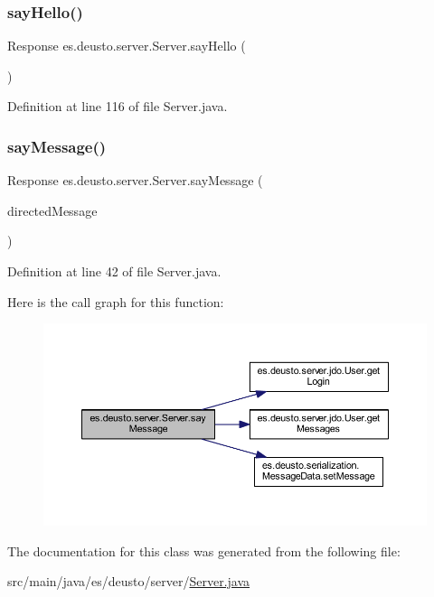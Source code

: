 \subsubsection{\texorpdfstring{sayHello()}{sayHello()}}
{\footnotesize\ttfamily Response es.\+deusto.\+server.\+Server.\+say\+Hello (\begin{DoxyParamCaption}{ }\end{DoxyParamCaption})}



Definition at line 116 of file Server.\+java.

\mbox{\label{classes_1_1deusto_1_1server_1_1_server_ae90127b1bf186f1d871a5a0f98c37da0}} 
\subsubsection{\texorpdfstring{sayMessage()}{sayMessage()}}
{\footnotesize\ttfamily Response es.\+deusto.\+server.\+Server.\+say\+Message (\begin{DoxyParamCaption}\item[{\mbox{\hyperlink{classes_1_1deusto_1_1serialization_1_1_directed_message}{Directed\+Message}}}]{directed\+Message }\end{DoxyParamCaption})}



Definition at line 42 of file Server.\+java.

Here is the call graph for this function\+:
\nopagebreak
\begin{figure}[H]
\begin{center}
\leavevmode
\includegraphics[width=350pt]{classes_1_1deusto_1_1server_1_1_server_ae90127b1bf186f1d871a5a0f98c37da0_cgraph}
\end{center}
\end{figure}


The documentation for this class was generated from the following file\+:\begin{DoxyCompactItemize}
\item 
src/main/java/es/deusto/server/\mbox{\hyperlink{_server_8java}{Server.\+java}}\end{DoxyCompactItemize}
